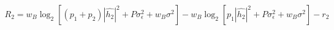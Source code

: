 \documentclass[preview]{standalone}
\begin{document}
\begin{align*}
R_2 = w_B \log_2 \left[(p_1 + p_2) \left|\hat{h_2}\right|^2 + P \sigma_{\epsilon}^2 + w_B \sigma^2\right] - w_B \log_2 \left[p_1 \left|\hat{h_2}\right|^2 + P \sigma_{\epsilon}^2 + w_B \sigma^2\right] - r_2
\end{align*}
\end{document}
